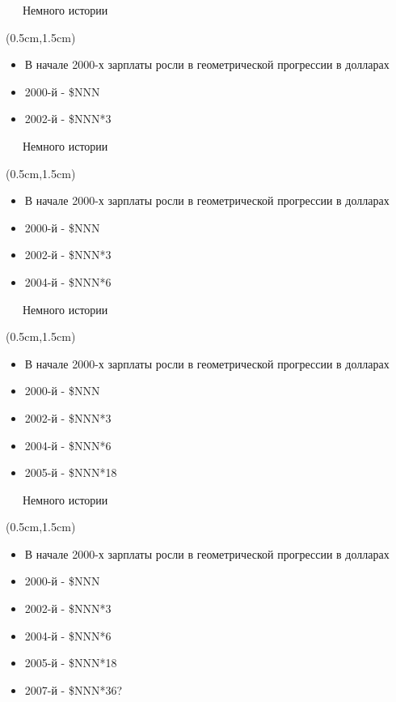\documentclass[xetex,18pt,aspectratio=43]{beamer}
\begin{document}
\begin{Large}
\begin{frame}{\ \ \ Немного истории}
\begin{textblock*}{\framewidth-0.8cm}(0.5cm,1.5cm)
\begin{itemize}
  \item В начале 2000-х зарплаты росли в геометрической прогрессии в долларах
  \item 2000-й - \$NNN
  \item 2002-й - \$NNN*3
\end{itemize}
\end{textblock*}
\end{frame}

\begin{frame}{\ \ \ Немного истории}
\begin{textblock*}{\framewidth-0.8cm}(0.5cm,1.5cm)
\begin{itemize}
  \item В начале 2000-х зарплаты росли в геометрической прогрессии в долларах
  \item 2000-й - \$NNN
  \item 2002-й - \$NNN*3
  \item 2004-й - \$NNN*6
\end{itemize}
\end{textblock*}
\end{frame}

\begin{frame}{\ \ \ Немного истории}
\begin{textblock*}{\framewidth-0.8cm}(0.5cm,1.5cm)
\begin{itemize}
  \item В начале 2000-х зарплаты росли в геометрической прогрессии в долларах
  \item 2000-й - \$NNN
  \item 2002-й - \$NNN*3
  \item 2004-й - \$NNN*6
  \item 2005-й - \$NNN*18
\end{itemize}
\end{textblock*}
\end{frame}

\begin{frame}{\ \ \ Немного истории}
\begin{textblock*}{\framewidth-0.8cm}(0.5cm,1.5cm)
\begin{itemize}
  \item В начале 2000-х зарплаты росли в геометрической прогрессии в долларах
  \item 2000-й - \$NNN
  \item 2002-й - \$NNN*3
  \item 2004-й - \$NNN*6
  \item 2005-й - \$NNN*18
  \item 2007-й - \$NNN*36?
\end{itemize}
\end{textblock*}
\end{frame}


\end{Large}
\end{document}
